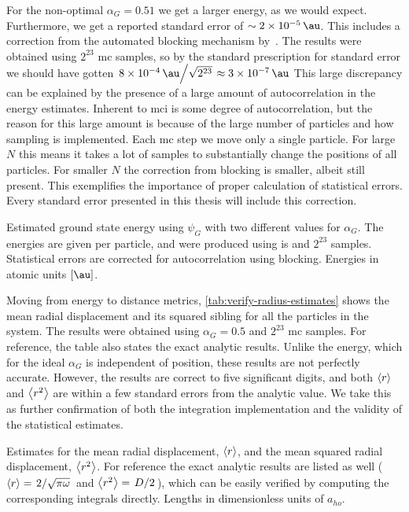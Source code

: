 \documentclass[Thesis.tex]{subfiles}
\begin{document}
For the non-optimal $\alpha_G=0.51$ we get a larger energy, as we would expect.
Furthermore, we get a reported standard error of $\sim \SI{2e-5}{\au}$. This
includes a correction from the automated blocking mechanism
by~\textcite{Jonsson-2018}. The results were obtained using $2^{23}$ \gls{mc}
samples, so by the standard prescription for standard error we should have
gotten $\flatfrac{\SI{8e-4}{\au}}{\sqrt{2^{23}}} \approx \SI{3e-7}{\au}$ This
large discrepancy can be explained by the presence of a large amount of
autocorrelation in the energy estimates. Inherent to \gls{mci} is
some degree of autocorrelation, but the reason for this large amount is because
of the large number of particles and how sampling is implemented. Each \gls{mc}
step we move only a single particle. For large $N$ this means it takes a
lot of samples to substantially change the positions of all particles. For smaller
$N$ the correction from blocking is smaller, albeit still present. This
exemplifies the importance of proper calculation of statistical errors. Every
standard error presented in this thesis will include this correction.


\begin{table}[h]
  \centering
  \caption[Ground state energies of the ideal harmonic oscillator]{\label{tab:verify-energy-estimates}Estimated ground state energy
    using $\psi_G$ with two different values for $\alpha_G$. The energies are
    given per particle, and were produced using \gls{is} and
    $2^{23}$ samples. Statistical errors are corrected for autocorrelation using
    blocking. Energies in atomic units $[\si{\au}]$.}
  
\end{table}

Moving from energy to distance metrics, \cref{tab:verify-radius-estimates} shows
the mean radial displacement and its squared sibling for all the particles in the system.
The results were obtained using $\alpha_G=0.5$ and $2^{23}$ \gls{mc} samples. For
reference, the table also states the exact analytic results. Unlike the energy,
which for the ideal $\alpha_G$ is independent of position, these results are not
perfectly accurate. However, the results are correct to five significant digits,
and both $\expval{r}$ and $\expval{r^2}$ are within a few standard errors from
the analytic value. We take this as further confirmation of both the integration
implementation and the validity of the statistical estimates.

\begin{table}[h]
  \centering
  \caption[Radial metrics of the ideal harmonic oscillator]{\label{tab:verify-radius-estimates}Estimates for the mean radial
    displacement, $\expval{r}$, and the mean squared radial displacement,
    $\expval{r^2}$. For reference the exact analytic results are listed as well
    ($\expval{r}=\flatfrac{2}{\sqrt{\pi\omega}}$ and
    $\expval{r^2}=\flatfrac{D}{2}$), which can be easily verified by computing
    the corresponding integrals directly. Lengths in dimensionless units of $a_{ho}$.}
  
\end{table}
\end{document}

